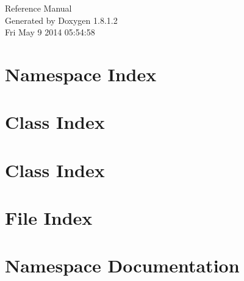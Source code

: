 \documentclass{article}
\begin{document}
\hypersetup{pageanchor=false,citecolor=blue}
\begin{titlepage}
\vspace*{7cm}
\begin{center}
{\Large Reference Manual}\\
\vspace*{1cm}
{\large Generated by Doxygen 1.8.1.2}\\
\vspace*{0.5cm}
{\small Fri May 9 2014 05:54:58}\\
\end{center}
\end{titlepage}
\tableofcontents
{}
\hypersetup{pageanchor=true,citecolor=blue}
\section{Namespace Index}

\section{Class Index}

\section{Class Index}

\section{File Index}

\section{Namespace Documentation}






\end{document}
